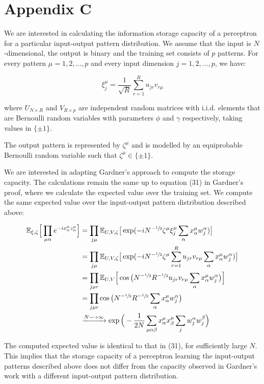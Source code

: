 \section*{Appendix C}


We are interested in calculating the information storage capacity of a perceptron for a particular input-output pattern distribution. We assume that the input is $N$-dimensional, the output is binary and the training set consists of $p$ patterns. For every pattern $\mu = 1, 2, ..., p$ and every input dimension $j = 1, 2, ..., p$, we have:

\begin{equation}
    \xi_j^\mu = \frac{1}{\sqrt{R}} \sum_{r=1}^R u_{j r} v_{r \mu}
\end{equation}

\noindent where $U_{N \times R}$ and $V_{R \times p}$ are independent random matrices with i.i.d. elements that are Bernoulli random variables with parameters $\phi$ and  $\gamma$ respectively, taking values in $\{ \pm 1 \}$.

The output pattern is represented by $\zeta^\mu$ and is modelled by an equiprobable Bernoulli random variable such that $\zeta^\mu \in \{ \pm 1 \}$.

We are interested in adapting Gardner's approach to compute the storage capacity. The calculations remain the same up to equation (31) in Gardner's proof, where we calculate the expected value over the training set. We compute the same expected value over the input-output pattern distribution described above:

\begin{align}
    \mathbb{E}_{\xi, \zeta} \Big[ \prod_{\mu\alpha} e^{-ix_\alpha^\mu z_\alpha^\mu} \Big]
    &= \prod_{j\mu} \mathbb{E}_{U, V, \zeta} \big[ \exp(-i N^{-\sfrac{1}{2}} \zeta^\mu \xi_j^\mu \sum_\alpha x_\alpha^\mu w_{j}^\alpha) \big] \nonumber \\
    &= \prod_{j\mu} \mathbb{E}_{U, V, \zeta} \big[ \exp(-i N^{-\sfrac{1}{2}} \zeta^\mu \sum_{r=1}^R u_{jr} v_{r \mu} \sum_\alpha x_\alpha^\mu w_{j}^\alpha) \big] \nonumber \\
    &= \prod_{j \mu r} \mathbb{E}_{U, V} \Big[ \cos \big( N^{-\sfrac{1}{2}} R^{-\sfrac{1}{2}} u_{jr} v_{r \mu} \sum_\alpha x_\alpha^\mu w_{j}^\alpha \big) \Big] \nonumber \\
    &= \prod_{j \mu r} \cos \big( N^{-\sfrac{1}{2}} R^{-\sfrac{1}{2}} \sum_\alpha x_\alpha^\mu w_{j}^\alpha \big) \nonumber \\
    &\xrightarrow{N \longrightarrow \infty} \exp \Big( -\frac{1}{2N} \sum_{\mu\alpha\beta} x_\alpha^\mu x_\beta^\mu \sum_j w_j^\alpha w_j^\beta \Big)
\end{align}

The computed expected value is identical to that in (31), for sufficiently large $N$. This implies that the storage capacity of a perceptron learning the input-output patterns described above does not differ from the capacity observed in Gardner's work with a different input-output pattern distribution.